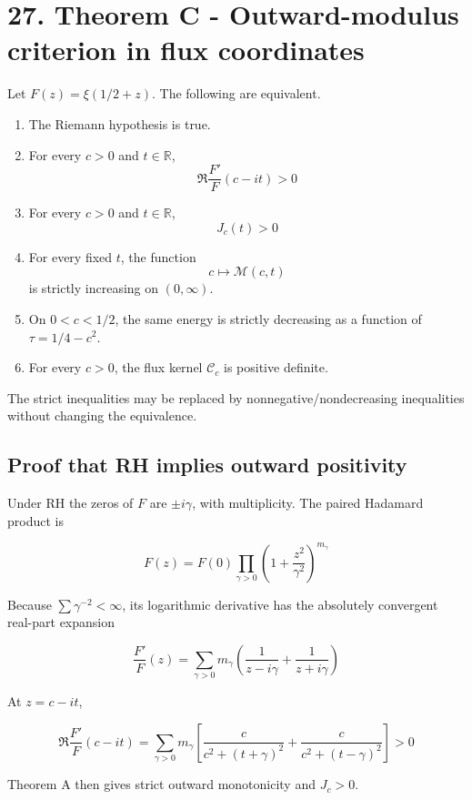 \documentclass[
  11pt,
]{book}
\providecommand{\tightlist}{%
  \setlength{\itemsep}{0pt}\setlength{\parskip}{0pt}}
\begin{document}
\section{27. Theorem C - Outward-modulus criterion in flux
coordinates}\label{theorem-c---outward-modulus-criterion-in-flux-coordinates}

Let \(F(z)=\xi(1/2+z)\). The following are equivalent.

\begin{enumerate}
\def\labelenumi{\arabic{enumi}.}
\tightlist
\item
  The Riemann hypothesis is true.
\item
  For every \(c>0\) and \(t\in\mathbb R\), \[
  \Re\frac{F'}F(c-it)>0
  \]
\item
  For every \(c>0\) and \(t\in\mathbb R\), \[
  J_c(t)>0
  \]
\item
  For every fixed \(t\), the function \[
  c\longmapsto\mathcal M(c,t)
  \] is strictly increasing on \((0,\infty)\).
\item
  On \(0<c<1/2\), the same energy is strictly decreasing as a function
  of \(\tau=1/4-c^2\).
\item
  For every \(c>0\), the flux kernel \(\mathcal C_c\) is positive
  definite.
\end{enumerate}

The strict inequalities may be replaced by nonnegative/nondecreasing
inequalities without changing the equivalence.

\subsection{Proof that RH implies outward
positivity}\label{proof-that-rh-implies-outward-positivity}

Under RH the zeros of \(F\) are \(\pm i\gamma\), with multiplicity. The
paired Hadamard product is

\[
F(z)=F(0)\prod_{\gamma>0}
\left(1+\frac{z^2}{\gamma^2}\right)^{m_\gamma}
\]

Because \(\sum\gamma^{-2}<\infty\), its logarithmic derivative has the
absolutely convergent real-part expansion

\[
\frac{F'}F(z)=
\sum_{\gamma>0}m_\gamma
\left(\frac1{z-i\gamma}+\frac1{z+i\gamma}\right)
\]

At \(z=c-it\),

\[
\Re\frac{F'}F(c-it)
=\sum_{\gamma>0}m_\gamma\left[
\frac{c}{c^2+(t+\gamma)^2}
+\frac{c}{c^2+(t-\gamma)^2}
\right]>0
\]

Theorem A then gives strict outward monotonicity and \(J_c>0\).
\end{document}

